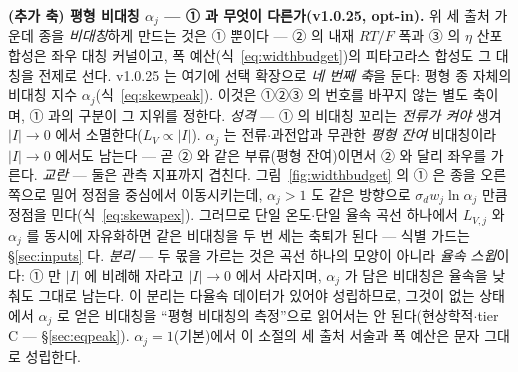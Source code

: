 \textbf{(추가 축) 평형 비대칭 $\alpha_j$ --- ① 과 무엇이 다른가(v1.0.25, opt-in).} 위 세 출처 가운데 종을
\emph{비대칭}하게 만드는 것은 ① 뿐이다 --- ② 의 내재 $RT/F$ 폭과 ③ 의 $\eta$ 산포 합성은 좌우 대칭 커널이고,
폭 예산(식~\eqref{eq:widthbudget})의 피타고라스 합성도 그 대칭을 전제로 선다. v1.0.25 는 여기에 선택 확장으로
\emph{네 번째 축}을 둔다: 평형 종 자체의 비대칭 지수 $\alpha_j$(식~\eqref{eq:skewpeak}). 이것은 ①②③ 의
번호를 바꾸지 않는 별도 축이며, ① 과의 구분이 그 지위를 정한다.
\emph{성격} --- ① 의 비대칭 꼬리는 \emph{전류가 켜야} 생겨 $|I|\!\to\!0$ 에서 소멸한다($L_V\propto|I|$).
$\alpha_j$ 는 전류$\cdot$과전압과 무관한 \emph{평형 잔여} 비대칭이라 $|I|\!\to\!0$ 에서도 남는다 --- 곧 ② 와
같은 부류(평형 잔여)이면서 ② 와 달리 좌우를 가른다.
\emph{교란} --- 둘은 관측 지표까지 겹친다. 그림~\ref{fig:widthbudget} 의 ① 은 종을 오른쪽으로 밀어 정점을
중심에서 이동시키는데, $\alpha_j>1$ 도 같은 방향으로 $\sigma_d w_j\ln\alpha_j$ 만큼 정점을
민다(식~\eqref{eq:skewapex}). 그러므로 단일 온도$\cdot$단일 율속 곡선 하나에서 $L_{V,j}$ 와 $\alpha_j$ 를
동시에 자유화하면 같은 비대칭을 두 번 세는 축퇴가 된다 --- 식별 가드는 \S\ref{sec:inputs} 다.
\emph{분리} --- 두 몫을 가르는 것은 곡선 하나의 모양이 아니라 \emph{율속 스윕}이다: ① 만 $|I|$ 에 비례해
자라고 $|I|\!\to\!0$ 에서 사라지며, $\alpha_j$ 가 담은 비대칭은 율속을 낮춰도 그대로 남는다. 이 분리는
다율속 데이터가 있어야 성립하므로, 그것이 없는 상태에서 $\alpha_j$ 로 얻은 비대칭을 ``평형 비대칭의
측정''으로 읽어서는 안 된다(현상학적$\cdot$tier C --- \S\ref{sec:eqpeak}). $\alpha_j=1$(기본)에서 이 소절의
세 출처 서술과 폭 예산은 문자 그대로 성립한다.

